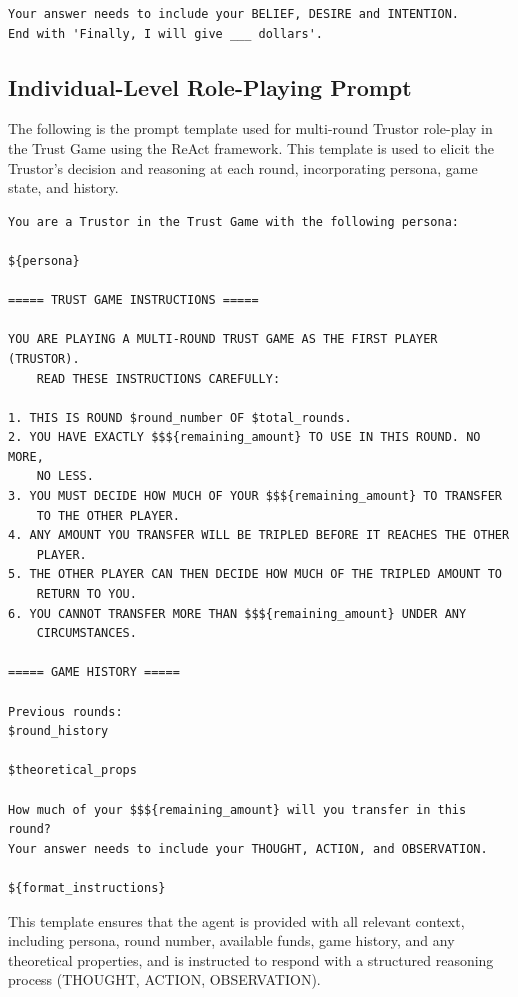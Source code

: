 \documentclass{article} %
\begin{document}
\begin{appendices}
\begin{lstlisting}[frame=single,basicstyle=\ttfamily\small,showspaces=false]
Your answer needs to include your BELIEF, DESIRE and INTENTION.
End with 'Finally, I will give ___ dollars'.
\end{lstlisting}


\subsection{Individual-Level Role-Playing Prompt}
\label{app:individual-roleplay}

The following is the prompt template used for multi-round Trustor role-play in the Trust Game using the ReAct framework. This template is used to elicit the Trustor's decision and reasoning at each round, incorporating persona, game state, and history.

\begin{lstlisting}[frame=single,basicstyle=\ttfamily\small,showspaces=false]
You are a Trustor in the Trust Game with the following persona:

${persona}

===== TRUST GAME INSTRUCTIONS =====

YOU ARE PLAYING A MULTI-ROUND TRUST GAME AS THE FIRST PLAYER (TRUSTOR).
    READ THESE INSTRUCTIONS CAREFULLY:

1. THIS IS ROUND $round_number OF $total_rounds.
2. YOU HAVE EXACTLY $$${remaining_amount} TO USE IN THIS ROUND. NO MORE,
    NO LESS.
3. YOU MUST DECIDE HOW MUCH OF YOUR $$${remaining_amount} TO TRANSFER
    TO THE OTHER PLAYER.
4. ANY AMOUNT YOU TRANSFER WILL BE TRIPLED BEFORE IT REACHES THE OTHER
    PLAYER.
5. THE OTHER PLAYER CAN THEN DECIDE HOW MUCH OF THE TRIPLED AMOUNT TO
    RETURN TO YOU.
6. YOU CANNOT TRANSFER MORE THAN $$${remaining_amount} UNDER ANY
    CIRCUMSTANCES.

===== GAME HISTORY =====

Previous rounds:
$round_history

$theoretical_props

How much of your $$${remaining_amount} will you transfer in this round?
Your answer needs to include your THOUGHT, ACTION, and OBSERVATION.

${format_instructions}
\end{lstlisting}

This template ensures that the agent is provided with all relevant context, including persona, round number, available funds, game history, and any theoretical properties, and is instructed to respond with a structured reasoning process (THOUGHT, ACTION, OBSERVATION).





\end{appendices}
\end{document}
